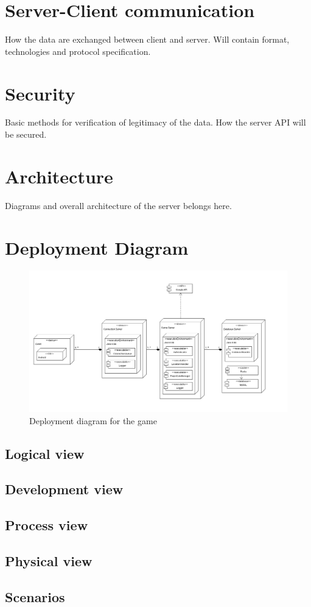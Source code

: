 \section{Server-Client communication}
How the data are exchanged between client and server. Will contain format, technologies and protocol specification. 

\section{Security}
Basic methods for verification of legitimacy of the data. How the server API will be secured.

\section{Architecture}
Diagrams and overall architecture of the server belongs here.

\section{Deployment Diagram}
\begin{figure}[h]	
	\includegraphics[width=\textwidth]{figures/DeploymentDiagram}
	\centering
	\caption{Deployment diagram for the game}	
\end{figure}

	\subsection{Logical view}
	
	\subsection{Development view}
	
	\subsection{Process view}
	
	\subsection{Physical view}
	
	\subsection{Scenarios}